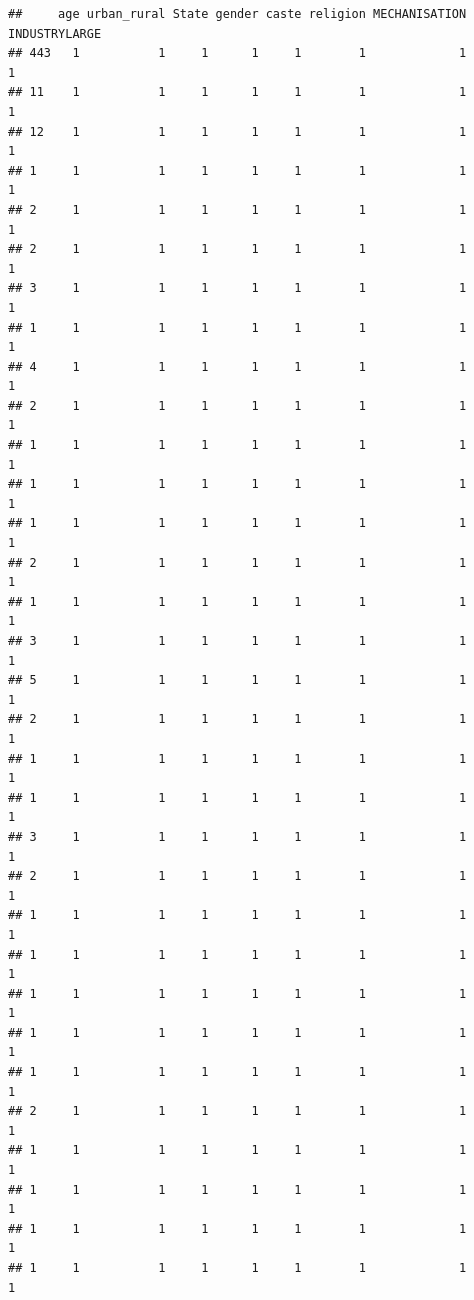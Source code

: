 \documentclass[
]{article}
\begin{document}
\begin{verbatim}
##     age urban_rural State gender caste religion MECHANISATION INDUSTRYLARGE
## 443   1           1     1      1     1        1             1             1
## 11    1           1     1      1     1        1             1             1
## 12    1           1     1      1     1        1             1             1
## 1     1           1     1      1     1        1             1             1
## 2     1           1     1      1     1        1             1             1
## 2     1           1     1      1     1        1             1             1
## 3     1           1     1      1     1        1             1             1
## 1     1           1     1      1     1        1             1             1
## 4     1           1     1      1     1        1             1             1
## 2     1           1     1      1     1        1             1             1
## 1     1           1     1      1     1        1             1             1
## 1     1           1     1      1     1        1             1             1
## 1     1           1     1      1     1        1             1             1
## 2     1           1     1      1     1        1             1             1
## 1     1           1     1      1     1        1             1             1
## 3     1           1     1      1     1        1             1             1
## 5     1           1     1      1     1        1             1             1
## 2     1           1     1      1     1        1             1             1
## 1     1           1     1      1     1        1             1             1
## 1     1           1     1      1     1        1             1             1
## 3     1           1     1      1     1        1             1             1
## 2     1           1     1      1     1        1             1             1
## 1     1           1     1      1     1        1             1             1
## 1     1           1     1      1     1        1             1             1
## 1     1           1     1      1     1        1             1             1
## 1     1           1     1      1     1        1             1             1
## 1     1           1     1      1     1        1             1             1
## 2     1           1     1      1     1        1             1             1
## 1     1           1     1      1     1        1             1             1
## 1     1           1     1      1     1        1             1             1
## 1     1           1     1      1     1        1             1             1
## 1     1           1     1      1     1        1             1             1

\end{verbatim}
\end{document}
